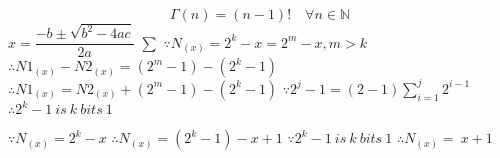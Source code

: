 $$ \Gamma(n)=(n-1)!\quad\forall n\in\mathbb N $$
$ x= \dfrac{-b \pm \sqrt{b^2 - 4ac}}{2a} $
$ \sum $
$ \because N_{(x)}= 2^k-x = 2^m-x , m>k$
$\therefore N1_{(x)} - N2_{(x)}=(2^m-1)-(2^k-1)$
$ \therefore N1_{(x)} = N2_{(x)}+(2^m-1)-(2^k-1)$
$ \because 2^j-1=(2-1)\sum_{i=1}^j2^{i-1} $
$ \therefore 2^k-1\ is\ k\ bits\ 1\ $

$\because N_{(x)} = 2^k-x$
$\therefore N_{(x)}=(2^k-1)-x+1$
$\because 2^k-1\ is\ k\ bits\ 1$
$\therefore N_{(x)}=~x+1$